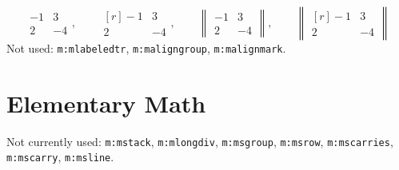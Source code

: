 \documentclass{article}
\newcommand{\mml}[1]{\texttt{m:#1}}
\begin{document}
\begin{equation}
  \begin{matrix} -1 & 3 \\ 2 & -4 \end{matrix}
,\qquad
  \begin{matrix*}[r] -1 & 3 \\ 2 & -4 \end{matrix*}
,\qquad
  \begin{Vmatrix} -1 & 3 \\ 2 & -4 \end{Vmatrix}
,\qquad
  \begin{Vmatrix*}[r] -1 & 3 \\ 2 & -4 \end{Vmatrix*}
\end{equation}
Not used: \mml{mlabeledtr}, \mml{maligngroup}, \mml{malignmark}.

\section{Elementary Math}
Not currently used:
\mml{mstack}, \mml{mlongdiv}, \mml{msgroup}, \mml{msrow},
\mml{mscarries}, \mml{mscarry}, \mml{msline}.
\end{document}
